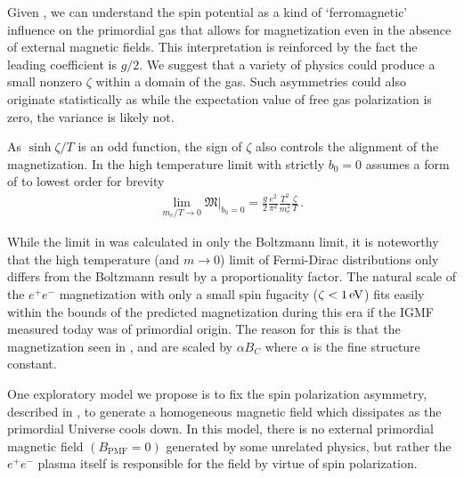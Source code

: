 Given , we can understand the spin potential as a kind of `ferromagnetic' influence on the primordial gas that allows for magnetization even in the absence of external magnetic fields. This interpretation is reinforced by the fact the leading coefficient is $g/2$. We suggest that a variety of physics could produce a small nonzero $\zeta$ within a domain of the gas. Such asymmetries could also originate statistically as while the expectation value of free gas polarization is zero, the variance is likely not.

As $\sinh{\zeta/T}$ is an odd function, the sign of $\zeta$ also controls the alignment of the magnetization. In the high temperature limit  with strictly $b_{0}=0$ assumes a form of to lowest order for brevity
\begin{align}
 \label{hiTferro}
 \lim_{m_{e}/T\rightarrow0}{\mathfrak M}\vert_{b_{0}=0}=\frac{g}{2}\frac{e^{2}}{\pi^{2}}\frac{T^{2}}{m_{e}^{2}}\frac{\zeta}{T}\,.
\end{align}

While the limit in  was calculated in only the Boltzmann limit, it is noteworthy that the high temperature (and $m\rightarrow0$) limit of Fermi-Dirac distributions only differs from the Boltzmann result by a proportionality factor. The natural scale of the $e^{+}e^{-}$ magnetization with only a small spin fugacity ($\zeta<1\text{\,eV}$) fits easily within the bounds of the predicted magnetization during this era if the IGMF measured today was of primordial origin. The reason for this is that the magnetization seen in ,  and  are scaled by $\alpha{B}_{C}$ where $\alpha$ is the fine structure constant.

\label{sec:self}
\noindent One exploratory model we propose is to fix the spin polarization asymmetry, described in , to generate a homogeneous magnetic field which dissipates as the primordial Universe cools down. In this model, there is no external primordial magnetic field $({B}_\mathrm{PMF}=0)$ generated by some unrelated physics, but rather the $e^{+}e^{-}$ plasma itself is responsible for the field by virtue of spin polarization.

